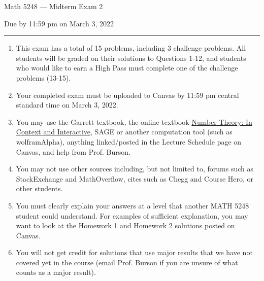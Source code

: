 \documentclass[11pt,addpoints,letterpaper]{exam}
\begin{document}
\vspace*{-0.5in}

\ifprintanswers
\begin{center}
\end{center}
\fi

{\centering

\LARGE Math 5248 --- Midterm Exam 2

}

\smallskip

{\centering

\large Due by 11:59 pm on March 3, 2022

}

\bigskip\bigskip


\hrule

\begin{enumerate}[leftmargin=2em,rightmargin=1em]\setlength{\itemsep}{-2pt}


\item This exam has a total of 15 problems, including 3 challenge problems. All students will be graded on their solutions to Questions 1-12, and students who would like to earn a High Pass must complete one of the challenge problems (13-15). 


\item Your completed exam must be uploaded to Canvas by 11:59 pm central standard time on March 3, 2022.  

\item You may use the Garrett textbook, the online textbook \href{http://math.gordon.edu/ntic/ntic/frontmatter-1.html}{Number Theory: In Context and Interactive}, SAGE or another computation tool (such as wolframAlpha), anything linked/posted in the Lecture Schedule page on Canvas, and help from Prof. Burson.

\item You may not use other sources including, but not limited to, forums such as StackExchange and MathOverflow, cites such as Chegg and Course Hero, or other students. 

\item You must clearly explain your answers at a level that another MATH 5248 student could understand.  For examples of sufficient explanation, you may  want to look at the Homework 1 and Homework 2 solutions posted on Canvas.  

\item You will not get credit for solutions that use major results that we have not covered yet in the course (email Prof. Burson if you are unsure of what counts as a major result). 


\end{enumerate}
\end{document}
